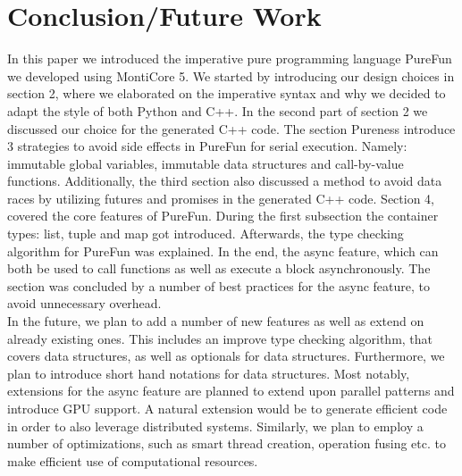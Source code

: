 \section{Conclusion/Future Work}
In this paper we introduced the imperative pure programming language PureFun we developed using MontiCore 5. We started by introducing our design choices in section 2, where we elaborated on the imperative syntax and why we decided to adapt the style of both Python and C++. In the second part of section 2 we discussed our choice for the generated C++ code. The section Pureness introduce 3 strategies to avoid side effects in PureFun for serial execution. Namely: immutable global variables, immutable data structures and call-by-value functions. Additionally, the third section also discussed a method to avoid data races by utilizing futures and promises in the generated C++ code. Section 4, covered the core features of PureFun. During the first subsection the container types: list, tuple and map got introduced. Afterwards, the type checking algorithm for PureFun was explained. In the end, the async feature, which can both be used to call functions as well as execute a block asynchronously. The section was concluded by a number of best practices for the async feature, to avoid unnecessary overhead.\\
In the future, we plan to add a number of new features as well as extend on already existing ones. This includes an improve type checking algorithm, that covers data structures, as well as optionals for data structures. Furthermore, we plan to introduce short hand notations for data structures. Most notably, extensions for the async feature are planned to extend upon parallel patterns and introduce GPU support.
A natural extension would be to generate efficient code in order to also leverage distributed systems. Similarly, we plan to employ a number of optimizations, such as smart thread creation, operation fusing etc. to make efficient use of computational resources.